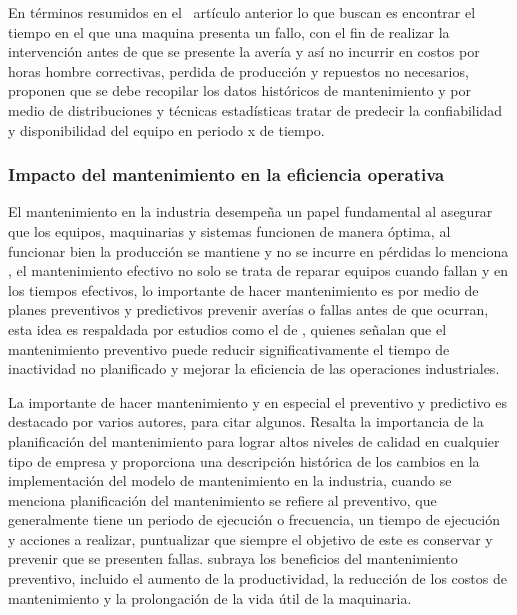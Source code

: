 \documentclass[
  11pt,
  bookmarksnumbered]{article}
\begin{document}
En términos resumidos en el ~artículo anterior lo que buscan es encontrar el tiempo en el que una maquina presenta un fallo, con el fin de realizar la intervención antes de que se presente la avería y así no incurrir en costos por horas hombre correctivas, perdida de producción y repuestos no necesarios, proponen que se debe recopilar los datos históricos de mantenimiento y por medio de distribuciones y técnicas estadísticas tratar de predecir la confiabilidad y disponibilidad del equipo en periodo x de tiempo.

\hypertarget{impacto-del-mantenimiento-en-la-eficiencia-operativa}{%
\subsubsection{Impacto del mantenimiento en la eficiencia operativa}\label{impacto-del-mantenimiento-en-la-eficiencia-operativa}}

El mantenimiento en la industria desempeña un papel fundamental al asegurar que los equipos, maquinarias y sistemas funcionen de manera óptima, al funcionar bien la producción se mantiene y no se incurre en pérdidas lo menciona \textcite{Jardine2013}, el mantenimiento efectivo no solo se trata de reparar equipos cuando fallan y en los tiempos efectivos, lo importante de hacer mantenimiento es por medio de planes preventivos y predictivos prevenir averías o fallas antes de que ocurran, esta idea es respaldada por estudios como el de \textcite{Kumar2018}, quienes señalan que el mantenimiento preventivo puede reducir significativamente el tiempo de inactividad no planificado y mejorar la eficiencia de las operaciones industriales.

La importante de hacer mantenimiento y en especial el preventivo y predictivo es destacado por varios autores, para citar algunos.
\textcite{Olarte2010ImportanciaDM} Resalta la importancia de la planificación del mantenimiento para lograr altos niveles de calidad en cualquier tipo de empresa y proporciona una descripción histórica de los cambios en la implementación del modelo de mantenimiento en la industria, cuando se menciona planificación del mantenimiento se refiere al preventivo, que generalmente tiene un periodo de ejecución o frecuencia, un tiempo de ejecución y acciones a realizar, puntualizar que siempre el objetivo de este es conservar y prevenir que se presenten fallas.
\textcite{ARROYOVACA2022ImportanciaDL} subraya los beneficios del mantenimiento preventivo, incluido el aumento de la productividad, la reducción de los costos de mantenimiento y la prolongación de la vida útil de la maquinaria.
\end{document}
